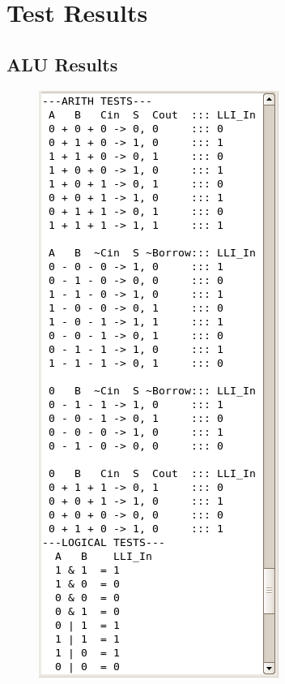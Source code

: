 \chapter{Test Results}

\section{ALU Results}
\label{chap:ALUTestResults}

\begin{figure}[h]
	\centering
	\includegraphics[scale=0.72]{results/ALUSliceA.png}

\end{figure}
